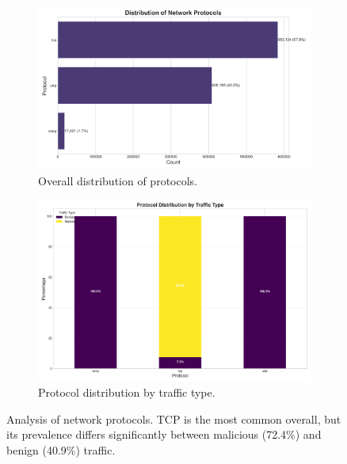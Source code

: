 \begin{figure}[htbp]
    \centering
    \begin{subfigure}[b]{0.48\textwidth}
        \centering
        \includegraphics[width=\textwidth]{figures/protocol_distribution.png}
        \caption{Overall distribution of protocols.}
        \label{fig:protocol_distribution}
    \end{subfigure}
    \hfill %
    \begin{subfigure}[b]{0.48\textwidth}
        \centering
        \includegraphics[width=\textwidth]{figures/protocol_by_label.png}
        \caption{Protocol distribution by traffic type.}
        \label{fig:protocol_by_label}
    \end{subfigure}
    
    \caption{Analysis of network protocols. TCP is the most common overall, but its prevalence differs significantly between malicious (72.4\%) and benign (40.9\%) traffic.}
    \label{fig:protocol_analysis} %
\end{figure}

